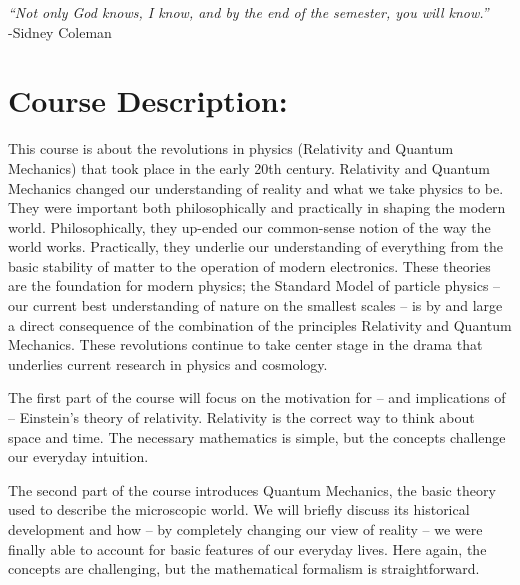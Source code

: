 \documentclass[margin,line]{res}
\begin{document}



\begin{resume}
{ \textit{\large``Not only God knows, I know, and by the end of the semester, you will know.''}\\ \hspace*{5in} -Sidney Coleman}

\section{Course Description:}

This course is about the revolutions in physics (Relativity and Quantum Mechanics) that took place in the early 20th century.
Relativity and Quantum Mechanics changed our understanding of reality and what we take physics to be.
They were important both philosophically and practically in shaping the modern world.
Philosophically, they up-ended our common-sense notion of the way the world works.
Practically, they underlie our understanding of everything from the basic stability of matter to the operation of modern electronics.
These theories are the foundation for modern physics;
the Standard Model of particle physics -- our current best understanding of nature on the smallest scales -- is by and large a direct consequence of the combination of the principles Relativity and Quantum Mechanics.
These revolutions continue to take center stage in the drama that underlies current research in physics and cosmology.

The first part of the course will focus on the motivation for -- and implications of -- Einstein's theory of relativity.
Relativity is the correct way to think about space and time.
The necessary mathematics is simple, but the concepts challenge our everyday intuition.

The second part of the course introduces Quantum Mechanics, the basic theory used to describe the microscopic world.
We will briefly discuss its historical development and how -- by completely changing our view of reality -- we were finally able to account for basic features of our everyday lives.
Here again, the concepts are challenging, but the mathematical formalism is straightforward.


\end{resume}
\end{document}
